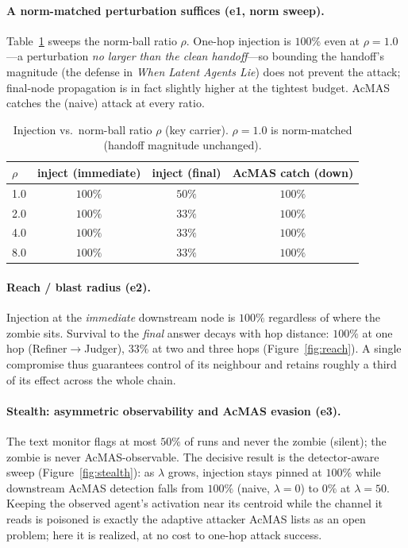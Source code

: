 \documentclass{article}
\begin{document}
\paragraph{A norm-matched perturbation suffices (e1, norm sweep).} Table~\ref{tab:norm} sweeps the norm-ball ratio $\rho$. One-hop injection is $100\%$ even at $\rho=1.0$---a perturbation \emph{no larger than the clean handoff}---so bounding the handoff's magnitude (the defense in \emph{When Latent Agents Lie}) does not prevent the attack; final-node propagation is in fact slightly higher at the tightest budget. AcMAS catches the (naive) attack at every ratio.

\begin{table}[h]
\centering
\caption{Injection vs.\ norm-ball ratio $\rho$ (key carrier). $\rho=1.0$ is norm-matched (handoff magnitude unchanged).}
\label{tab:norm}
\begin{tabular}{lccc}
\toprule
$\rho$ & inject (immediate) & inject (final) & AcMAS catch (down) \\
\midrule
1.0 & $100\%$ & $50\%$ & $100\%$ \\
2.0 & $100\%$ & $33\%$ & $100\%$ \\
4.0 & $100\%$ & $33\%$ & $100\%$ \\
8.0 & $100\%$ & $33\%$ & $100\%$ \\
\bottomrule
\end{tabular}
\end{table}

\paragraph{Reach / blast radius (e2).} Injection at the \emph{immediate} downstream node is $100\%$ regardless of where the zombie sits. Survival to the \emph{final} answer decays with hop distance: $100\%$ at one hop (Refiner$\to$Judger), $33\%$ at two and three hops (Figure~\ref{fig:reach}). A single compromise thus guarantees control of its neighbour and retains roughly a third of its effect across the whole chain.

\paragraph{Stealth: asymmetric observability and AcMAS evasion (e3).} The text monitor flags at most $50\%$ of runs and never the zombie (silent); the zombie is never AcMAS-observable. The decisive result is the detector-aware sweep (Figure~\ref{fig:stealth}): as $\lambda$ grows, injection stays pinned at $100\%$ while downstream AcMAS detection falls from $100\%$ (naive, $\lambda=0$) to \textbf{$0\%$} at $\lambda=50$. Keeping the observed agent's activation near its centroid while the channel it reads is poisoned is exactly the adaptive attacker AcMAS lists as an open problem; here it is realized, at no cost to one-hop attack success.
\end{document}
